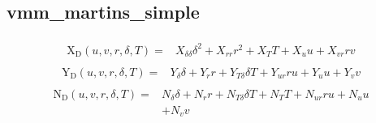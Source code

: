 \documentclass[review]{elsarticle}
\begin{document}
\subsection{vmm\_martins\_simple}
\label{\detokenize{appendix_vmms:vmm-martins-simple}}\begin{equation}\label{equation:appendix_vmms:eq_X_D_vmm_martins_simple}
\begin{split}
\begin{align*}
\operatorname{X_{D}}{\left(u,v,r,\delta,T \right)} = & X_{\delta\delta} \delta^{2} + X_{rr} r^{2} + X_{T} T + X_{u} u + X_{vr} r v 
\end{align*}
\end{split}
\end{equation}\begin{equation}\label{equation:appendix_vmms:eq_Y_D_vmm_martins_simple}
\begin{split}
\begin{align*}
\operatorname{Y_{D}}{\left(u,v,r,\delta,T \right)} = & Y_{\delta} \delta + Y_{r} r + Y_{T\delta} \delta T + Y_{ur} r u + Y_{u} u + Y_{v} v 
\end{align*}
\end{split}
\end{equation}\begin{equation}\label{equation:appendix_vmms:eq_N_D_vmm_martins_simple}
\begin{split}
\begin{align*}
\operatorname{N_{D}}{\left(u,v,r,\delta,T \right)} = & N_{\delta} \delta + N_{r} r + N_{T\delta} \delta T + N_{T} T + N_{ur} r u + N_{u} u \\
& + N_{v} v 
\end{align*}
\end{split}
\end{equation}
\end{document}
